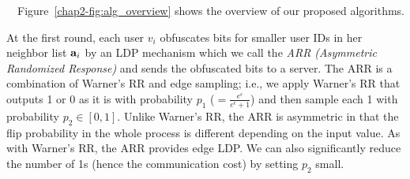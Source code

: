 \smallskip
{}~~Figure~\ref{chap2-fig:alg_overview} shows the overview of our proposed algorithms.

At the first round, each user $v_i$ obfuscates
bits for smaller user IDs in her neighbor list $\mathbf{a}_i$
by an LDP mechanism which we call the \textit{ARR (Asymmetric Randomized Response)} 
and sends the obfuscated bits to a server. 
The ARR is a combination of Warner's RR and edge sampling; i.e.,
we apply Warner's RR that outputs 1 or 0 as it is with probability
$p_1$ ($=\frac{e^{\epsilon}}{e^{\epsilon}+1}$)
and then sample each 1 with probability $p_2\in[0,1]$.
%
Unlike Warner's RR, the ARR is asymmetric in that the flip probability in the whole process is different
depending on the input value.
As with Warner's RR, the ARR provides edge LDP.
We can also significantly reduce the number of 1s (hence the communication cost) by setting
$p_2$ small.

